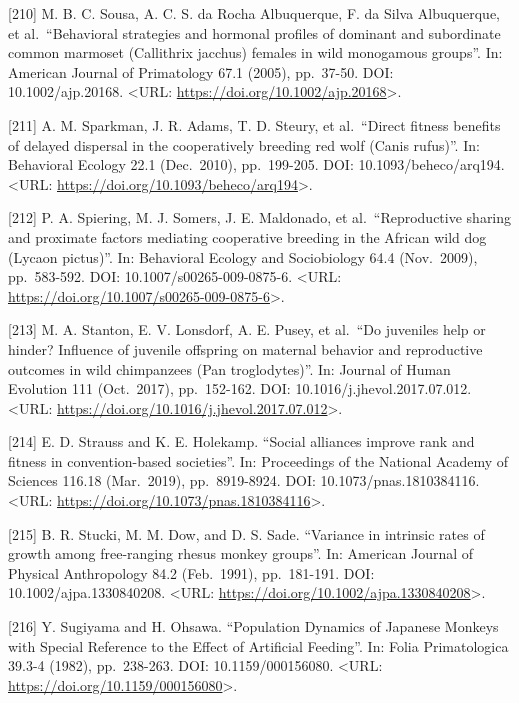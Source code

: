 \documentclass[
]{article}
\begin{document}
{[}210{]} M. B. C. Sousa, A. C. S. da Rocha Albuquerque, F. da Silva
Albuquerque, et al.~``Behavioral strategies and hormonal profiles of
dominant and subordinate common marmoset (Callithrix jacchus) females in
wild monogamous groups''. In: American Journal of Primatology 67.1
(2005), pp.~37-50. DOI: 10.1002/ajp.20168. \textless URL:
\url{https://doi.org/10.1002/ajp.20168}\textgreater.

{[}211{]} A. M. Sparkman, J. R. Adams, T. D. Steury, et al.~``Direct
fitness benefits of delayed dispersal in the cooperatively breeding red
wolf (Canis rufus)''. In: Behavioral Ecology 22.1 (Dec.~2010),
pp.~199-205. DOI: 10.1093/beheco/arq194. \textless URL:
\url{https://doi.org/10.1093/beheco/arq194}\textgreater.

{[}212{]} P. A. Spiering, M. J. Somers, J. E. Maldonado, et
al.~``Reproductive sharing and proximate factors mediating cooperative
breeding in the African wild dog (Lycaon pictus)''. In: Behavioral
Ecology and Sociobiology 64.4 (Nov.~2009), pp.~583-592. DOI:
10.1007/s00265-009-0875-6. \textless URL:
\url{https://doi.org/10.1007/s00265-009-0875-6}\textgreater.

{[}213{]} M. A. Stanton, E. V. Lonsdorf, A. E. Pusey, et al.~``Do
juveniles help or hinder? Influence of juvenile offspring on maternal
behavior and reproductive outcomes in wild chimpanzees (Pan
troglodytes)''. In: Journal of Human Evolution 111 (Oct.~2017),
pp.~152-162. DOI: 10.1016/j.jhevol.2017.07.012. \textless URL:
\url{https://doi.org/10.1016/j.jhevol.2017.07.012}\textgreater.

{[}214{]} E. D. Strauss and K. E. Holekamp. ``Social alliances improve
rank and fitness in convention-based societies''. In: Proceedings of the
National Academy of Sciences 116.18 (Mar.~2019), pp.~8919-8924. DOI:
10.1073/pnas.1810384116. \textless URL:
\url{https://doi.org/10.1073/pnas.1810384116}\textgreater.

{[}215{]} B. R. Stucki, M. M. Dow, and D. S. Sade. ``Variance in
intrinsic rates of growth among free-ranging rhesus monkey groups''. In:
American Journal of Physical Anthropology 84.2 (Feb.~1991), pp.~181-191.
DOI: 10.1002/ajpa.1330840208. \textless URL:
\url{https://doi.org/10.1002/ajpa.1330840208}\textgreater.

{[}216{]} Y. Sugiyama and H. Ohsawa. ``Population Dynamics of Japanese
Monkeys with Special Reference to the Effect of Artificial Feeding''.
In: Folia Primatologica 39.3-4 (1982), pp.~238-263. DOI:
10.1159/000156080. \textless URL:
\url{https://doi.org/10.1159/000156080}\textgreater.
\end{document}
